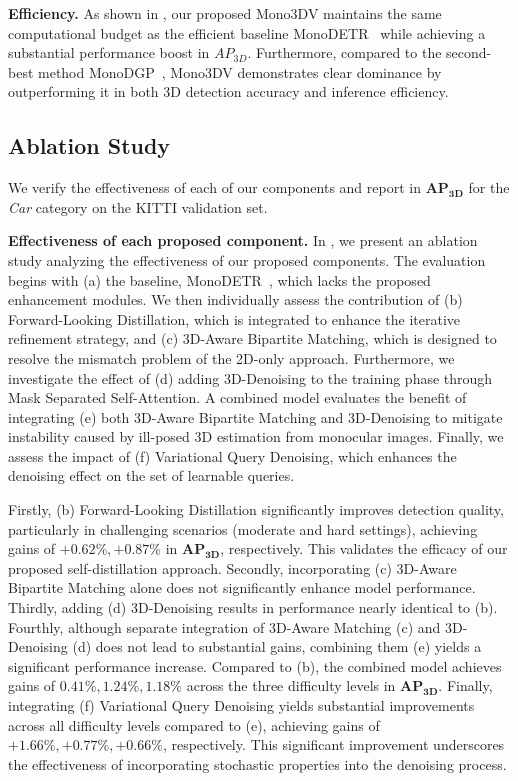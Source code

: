 \noindent\textbf{Efficiency.}
As shown in , our proposed Mono3DV maintains the same computational budget as the efficient baseline MonoDETR~\cite{MonoDETR} while achieving a substantial performance boost in $AP_{3D}$. Furthermore, compared to the second-best method MonoDGP~\cite{MonoDGP}, Mono3DV demonstrates clear dominance by outperforming it in both 3D detection accuracy and inference efficiency.



\subsection{Ablation Study}
\label{sec:experiments:ablation_study}
We verify the effectiveness of each of our components and report in $\mathbf{AP_{3D}}$ for the \textit{Car} category on the KITTI validation set.


\noindent\textbf{Effectiveness of each proposed component.} In , we present an ablation study analyzing the effectiveness of our proposed components. The evaluation begins with (a) the baseline, MonoDETR~\cite{MonoDETR}, which lacks the proposed enhancement modules. We then individually assess the contribution of (b) Forward-Looking Distillation, which is integrated to enhance the iterative refinement strategy, and (c) 3D-Aware Bipartite Matching, which is designed to resolve the mismatch problem of the 2D-only approach. Furthermore, we investigate the effect of (d) adding 3D-Denoising to the training phase through Mask Separated Self-Attention. A combined model evaluates the benefit of integrating (e) both 3D-Aware Bipartite Matching and 3D-Denoising to mitigate instability caused by ill-posed 3D estimation from monocular images. Finally, we assess the impact of (f) Variational Query Denoising, which enhances the denoising effect on the set of learnable queries.

Firstly, (b) Forward-Looking Distillation significantly improves detection quality, particularly in challenging scenarios (moderate and hard settings), achieving gains of $\mathbf{+0.62\%,+0.87\%}$ in $\mathbf{AP_{3D}}$, respectively. This validates the efficacy of our proposed self-distillation approach. Secondly, incorporating (c) 3D-Aware Bipartite Matching alone does not significantly enhance model performance. Thirdly, adding (d) 3D-Denoising results in performance nearly identical to (b). Fourthly, although separate integration of 3D-Aware Matching (c) and 3D-Denoising (d) does not lead to substantial gains, combining them (e) yields a significant performance increase. Compared to (b), the combined model achieves gains of $\mathbf{0.41\%, 1.24\%, 1.18\%}$ across the three difficulty levels in $\mathbf{AP_{3D}}$. Finally, integrating (f) Variational Query Denoising yields substantial improvements across all difficulty levels compared to (e), achieving gains of $\mathbf{+1.66\%, +0.77\%, +0.66\%}$, respectively. This significant improvement underscores the effectiveness of incorporating stochastic properties into the denoising process.

